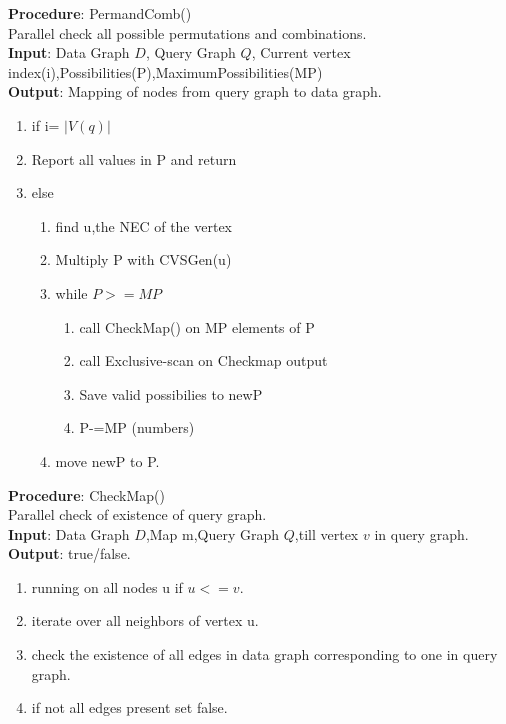 \begin{breakablealgorithm}[H]
\textbf{Procedure}: PermandComb()\\
Parallel check all possible permutations and combinations.\\
\textbf{Input}: Data Graph $D$, Query Graph $Q$, Current vertex index(i),Possibilities(P),MaximumPossibilities(MP)\\
\textbf{Output}: Mapping of nodes from query graph to data graph.\\
\begin{algorithmic}
\item \begin{enumerate}
\item if i= $|V(q)|$
\item Report all values in P and return
\item else
 \begin{enumerate}
\item find u,the NEC of the vertex
\item Multiply P with CVSGen(u)
\item while $P >= MP$
 \begin{enumerate}
\item call CheckMap() on MP elements of P
\item call Exclusive-scan on Checkmap output
\item Save valid possibilies to newP 
\item P-=MP (numbers)
\end{enumerate}
\item move newP to P.
\end{enumerate}
\end{enumerate}
\end{algorithmic}
\textbf{Procedure}: CheckMap()\\
Parallel check of existence of query graph.\\
\textbf{Input}: Data Graph $D$,Map m,Query Graph $Q$,till vertex $v$ in query graph.\\
\textbf{Output}: true/false.\\
\begin{algorithmic}
\item \begin{enumerate}
\item running on all nodes u if $u<=v$.
\item iterate over all neighbors of vertex u.
\item check the existence of all edges in data graph corresponding to one in query graph.
\item if not all edges present set false.
\end{enumerate}

\end{algorithmic}
\end{breakablealgorithm}


